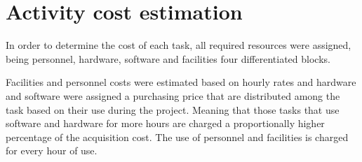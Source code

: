\section{Activity cost estimation}

In order to determine the cost of each task, all required resources were assigned, being personnel, hardware, software and facilities four differentiated blocks.

Facilities and personnel costs were estimated based on hourly rates and hardware and software were assigned a purchasing price that are distributed among the task based on their use during the project. Meaning that those tasks that use software and hardware for more hours are charged a proportionally higher percentage of the acquisition cost. The use of personnel and facilities is charged for every hour of use.
